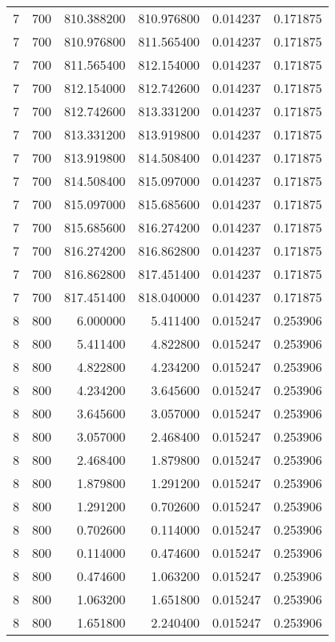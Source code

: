 \begin{longtable}{rrrrrr}
7 & 700 & 810.388200 & 810.976800 & 0.014237 & 0.171875 \\
7 & 700 & 810.976800 & 811.565400 & 0.014237 & 0.171875 \\
7 & 700 & 811.565400 & 812.154000 & 0.014237 & 0.171875 \\
7 & 700 & 812.154000 & 812.742600 & 0.014237 & 0.171875 \\
7 & 700 & 812.742600 & 813.331200 & 0.014237 & 0.171875 \\
7 & 700 & 813.331200 & 813.919800 & 0.014237 & 0.171875 \\
7 & 700 & 813.919800 & 814.508400 & 0.014237 & 0.171875 \\
7 & 700 & 814.508400 & 815.097000 & 0.014237 & 0.171875 \\
7 & 700 & 815.097000 & 815.685600 & 0.014237 & 0.171875 \\
7 & 700 & 815.685600 & 816.274200 & 0.014237 & 0.171875 \\
7 & 700 & 816.274200 & 816.862800 & 0.014237 & 0.171875 \\
7 & 700 & 816.862800 & 817.451400 & 0.014237 & 0.171875 \\
7 & 700 & 817.451400 & 818.040000 & 0.014237 & 0.171875 \\
8 & 800 & 6.000000 & 5.411400 & 0.015247 & 0.253906 \\
8 & 800 & 5.411400 & 4.822800 & 0.015247 & 0.253906 \\
8 & 800 & 4.822800 & 4.234200 & 0.015247 & 0.253906 \\
8 & 800 & 4.234200 & 3.645600 & 0.015247 & 0.253906 \\
8 & 800 & 3.645600 & 3.057000 & 0.015247 & 0.253906 \\
8 & 800 & 3.057000 & 2.468400 & 0.015247 & 0.253906 \\
8 & 800 & 2.468400 & 1.879800 & 0.015247 & 0.253906 \\
8 & 800 & 1.879800 & 1.291200 & 0.015247 & 0.253906 \\
8 & 800 & 1.291200 & 0.702600 & 0.015247 & 0.253906 \\
8 & 800 & 0.702600 & 0.114000 & 0.015247 & 0.253906 \\
8 & 800 & 0.114000 & 0.474600 & 0.015247 & 0.253906 \\
8 & 800 & 0.474600 & 1.063200 & 0.015247 & 0.253906 \\
8 & 800 & 1.063200 & 1.651800 & 0.015247 & 0.253906 \\
8 & 800 & 1.651800 & 2.240400 & 0.015247 & 0.253906 \\

\end{longtable}

